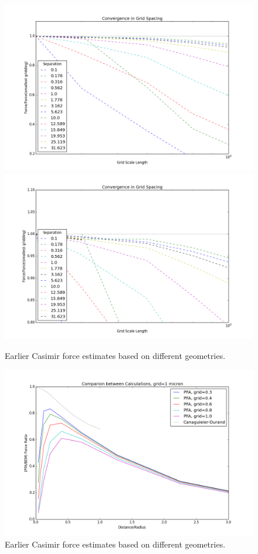 \documentclass[11pt]{article}
\begin{document}
\begin{figure}[h]
\centering
\includegraphics[width=5.5in]{pfa_convergence}
\includegraphics[width=5.5in]{pfa_convergence_zoom}
\caption{Earlier Casimir force estimates based on different geometries.}\label{fig:conv2}
\end{figure}

\begin{figure}[h]
\centering
\includegraphics[width=7in]{pfa_v_pec}
\caption{Earlier Casimir force estimates based on different geometries.}\label{fig:geometric}
\end{figure}
\end{document}
